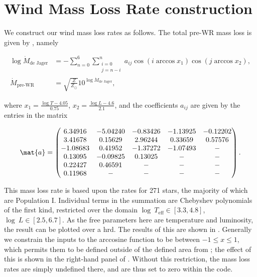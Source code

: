 \chapter{Wind Mass Loss Rate construction}\label{chap:mass_loss_construction}


We construct our wind mass loss rates as follows. The total pre-WR mass loss is given by \citet{De_jager:1988}, namely


\begin{align}
    \log\dot{M}_\text{de Jager} &= -\sum_{n=0}^6 \sum_{\substack{i=0\\j=n-i}}^n a_{ij}\cos\left(i\arccos x_1\right)\cos\left(j\arccos x_2\right),\label{eq:chebyshev}\\
    \dot{M}_\text{pre-WR} &= \sqrt{\frac{Z}{Z_\odot}}10^{\log\dot{M}_\text{de Jager}},\label{eq:pre-wr-ml}
\end{align}

where $x_1 = \frac{\log T-4.05}{0.75}$, $x_2=\frac{\log L-4.6}{2.1}$, and the coefficients $a_{ij}$ are given by the entries in the matrix

\begin{equation}
    \mat{a} = \begin{pmatrix}
      6.34916 &  -5.04240 &  -0.83426 &  -1.13925 & -0.12202 \\
      3.41678 &   0.15629 &   2.96244 &   0.33659 &  0.57576 \\
     -1.08683 &   0.41952 &  -1.37272 &  -1.07493 &        - \\
      0.13095 &  -0.09825 &   0.13025 &         - &        - \\
      0.22427 &   0.46591 &         - &         - &        - \\
      0.11968 &         - &         - &         - &        - \\
    \end{pmatrix}.
\end{equation}

This mass loss rate is based upon the rates for 271 stars, the majority of which are Population I. Individual terms in the summation are Chebyshev polynomials of the first kind, restricted over the domain $\log~T_\text{eff}\in\left[3.3, 4.8\right]$, $\log~L\in\left[2.5, 6.7\right]$. As the free parameters here are temperature and luminosity, the result can be plotted over a \gls{hrd}. The results of this are shown in . Generally we constrain the inputs to the arccosine function to be between $-1 \leq x \leq 1$, which permits them to be defined outside of the defined area from \citet{De_jager:1988}; the effect of this is shown in the right-hand panel of . Without this restriction, the mass loss rates are simply undefined there, and are thus set to zero within the code.

